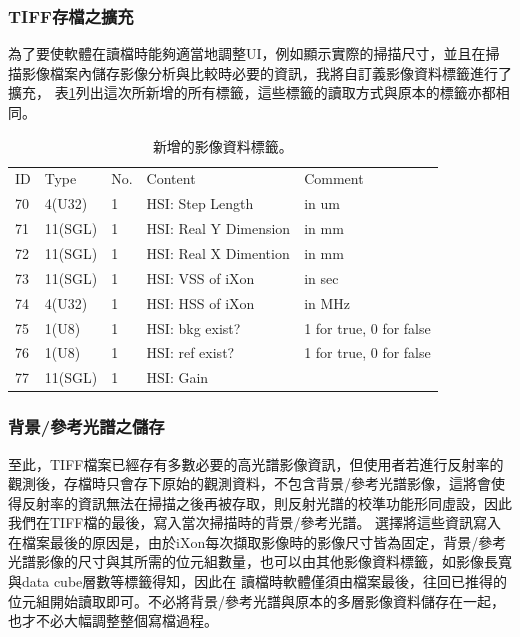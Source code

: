 \documentclass[12pt]{article}
\begin{document}
\subsubsection{TIFF存檔之擴充}
為了要使軟體在讀檔時能夠適當地調整UI，例如顯示實際的掃描尺寸，並且在掃描影像檔案內儲存影像分析與比較時必要的資訊，我將自訂義影像資料標籤進行了擴充，
表\ref{tab: new tag}列出這次所新增的所有標籤，這些標籤的讀取方式與原本的標籤亦都相同。

\begin{table}[ht]
    \begin{tabular}{lllll}
        ID & Type    & No. & Content               & Comment             \\
        70 & 4(U32)  & 1   & HSI: Step Length      & in um                   \\
        71 & 11(SGL) & 1   & HSI: Real Y Dimension & in mm                   \\
        72 & 11(SGL) & 1   & HSI: Real X Dimention & in mm                   \\
        73 & 11(SGL) & 1   & HSI: VSS of iXon      & in sec                  \\
        74 & 4(U32)  & 1   & HSI: HSS of iXon      & in MHz                  \\
        75 & 1(U8)   & 1   & HSI: bkg exist?       & 1 for true, 0 for false \\
        76 & 1(U8)   & 1   & HSI: ref exist?       & 1 for true, 0 for false \\
        77 & 11(SGL) & 1   & HSI: Gain             &
    \end{tabular}
    \caption{新增的影像資料標籤。}
    \label{tab: new tag}
\end{table}

\subsubsection{背景/參考光譜之儲存}
至此，TIFF檔案已經存有多數必要的高光譜影像資訊，但使用者若進行反射率的觀測後，存檔時只會存下原始的觀測資料，不包含背景/參考光譜影像，這將會使得反射率的資訊無法在掃描之後再被存取，則反射光譜的校準功能形同虛設，因此我們在TIFF檔的最後，寫入當次掃描時的背景/參考光譜。
選擇將這些資訊寫入在檔案最後的原因是，由於iXon每次擷取影像時的影像尺寸皆為固定，背景/參考光譜影像的尺寸與其所需的位元組數量，也可以由其他影像資料標籤，如影像長寬與data cube層數等標籤得知，因此在
讀檔時軟體僅須由檔案最後，往回已推得的位元組開始讀取即可。不必將背景/參考光譜與原本的多層影像資料儲存在一起，也才不必大幅調整整個寫檔過程。
\end{document}

